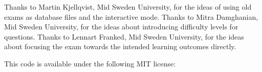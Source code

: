 Thanks to Martin Kjellqvist, Mid Sweden University, for the ideas of using old 
exams as database files and the interactive mode.
Thanks to Mitra Damghanian, Mid Sweden University, for the ideas about 
introducing difficulty levels for questions.
Thanks to Lennart Franked, Mid Sweden University, for the ideas about focusing 
the exam towards the intended learning outcomes directly.

This code is available under the following MIT license:
\begin{quote}
  
\end{quote}

